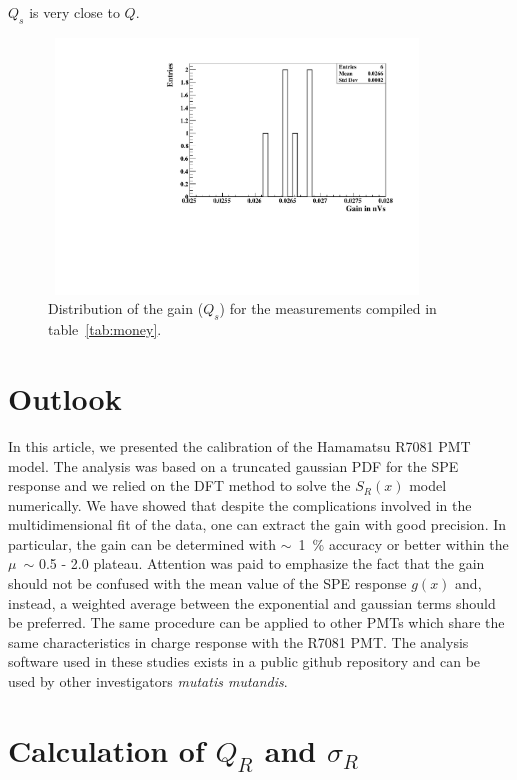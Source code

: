 \documentclass[a4paper,11pt]{article}
\begin{document}
$Q_s$ is very close to $Q$. 
\begin{figure}[!t]
\centering
\includegraphics[width=10.0cm, height=6.8cm]{figures/G.pdf} 
\caption{Distribution of the gain ($Q_s$) for the measurements compiled in table~\ref{tab:money}. }
\label{fig:g}
\end{figure}

\section{Outlook}
\label{sec:outro}

In this article, we presented the calibration of the Hamamatsu R7081 PMT model. 
The analysis was based on a truncated gaussian PDF for the SPE response and we relied on the DFT method to solve the $S_R(x)$ model numerically. 
We have showed that despite the complications involved in the multidimensional fit of the data, one can extract the gain with good precision. 
In particular, the gain can be determined with $\sim$~1~\% accuracy or better within the $\mu$~$\sim$ 0.5 - 2.0 plateau. 
Attention was paid to emphasize the fact that the gain should not be confused with the mean value of the SPE response $g(x)$ and, instead, 
a weighted average between the exponential and gaussian terms should be preferred. 
The same procedure can be applied to other PMTs which share the same characteristics in charge response with the R7081 PMT. 
The analysis software used in these studies exists in a public github repository and can be used by other investigators \emph{mutatis mutandis}. 


\appendix
%

\section{Calculation of $Q_R$ and $\sigma_R$}
\label{appA}
\end{document}
